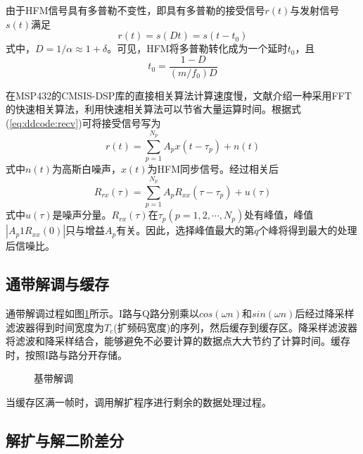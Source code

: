由于HFM信号具有多普勒不变性，即具有多普勒的接受信号$r(t)$与发射信号$s(t)$满足
\begin{equation}
r(t)=s(Dt)=s(t-t_0)
\end{equation}
式中，$D=1/\alpha\approx1+\delta$。可见，HFM将多普勒转化成为一个延时$t_0$，且
\begin{equation}
t_0=\frac{1-D}{(m/f_0)D}
\end{equation}

在MSP432的CMSIS-DSP库的直接相关算法计算速度慢，文献\cite{press2007numerical}介绍一种采用FFT的快速相关算法，利用快速相关算法可以节省大量运算时间。根据式(\ref{eq:ddcode:recv})可将接受信号写为
\begin{equation}
r(t)=\sum_{p=1}^{N_p}A_px(t-\tau_p)+n(t)
\end{equation}
式中$n(t)$为高斯白噪声，$x(t)$为HFM同步信号。经过相关后
\begin{equation}
R_{rx}(\tau)=\sum_{p=1}^{N_p}A_pR_{xx}(\tau-\tau_p)+u(\tau)
\end{equation}
式中$u(\tau)$是噪声分量。$R_{rx}(\tau)$在$\tau_p(p=1,2,\cdots,N_p)$处有峰值，峰值$|A_p1R_{xx}(0)|$只与增益$A_p$有关。因此，选择峰值最大的第$q$个峰将得到最大的处理后信噪比。

\subsection{通带解调与缓存}
通带解调过程如图\ref{fig:software:pass}所示。I路与Q路分别乘以$cos(\omega n)$和$sin(\omega n)$后经过降采样滤波器得到时间宽度为$T_c$(扩频码宽度)的序列，然后缓存到缓存区。降采样滤波器将滤波和降采样结合，能够避免不必要计算的数据点大大节约了计算时间。缓存时，按照I路与路分开存储。
\begin{figure}[htbp]
	\centering
	
	\caption{基带解调}
	\label{fig:software:pass}
\end{figure}

当缓存区满一帧时，调用解扩程序进行剩余的数据处理过程。

\subsection{解扩与解二阶差分}

	
	
	
	